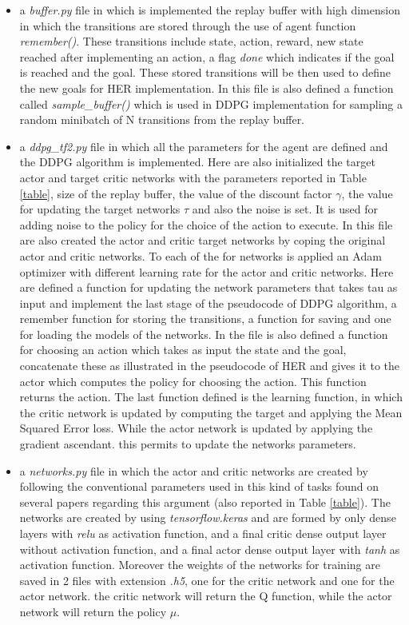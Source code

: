 \documentclass[a4paper]{report}
\begin{document}
\begin{itemize}
\item a \textit{buffer.py} file in which is implemented the replay buffer with high dimension in which the transitions are stored through the use of agent function \textit{remember()}. These transitions include state, action, reward, new state reached after implementing an action, a flag \textit{done} which indicates if the goal is reached and the goal. These stored transitions will be then used to define the new goals for HER implementation. In this file is also defined a function called \textit{sample\_buffer()} which is used in DDPG implementation for sampling a random minibatch of N transitions from the replay buffer.

\item a \textit{ddpg\_tf2.py} file in which all the parameters for the agent are defined and the DDPG algorithm is implemented. Here are also initialized the target actor and target critic networks with the parameters reported in Table \ref{table}, size of the replay buffer, the value of the discount factor $\gamma$, the value for updating the target networks $\tau$ and also the noise is set. It is used for adding noise to the policy for the choice of the action to execute. In this file are also created the actor and critic target networks by coping the original actor and critic networks. To each of the for networks is applied an Adam optimizer with different learning rate for the actor and critic networks. Here are defined a function for updating the network parameters that takes tau as input and implement the last stage of the pseudocode of DDPG algorithm, a remember function for storing the transitions, a function for saving and one for loading the models of the networks. In the file is also defined a function for choosing an action which takes as input the state and the goal, concatenate these as illustrated in the pseudocode of HER and gives it to the actor which computes the policy for choosing the action. This function returns the action. The last function defined is the learning function, in which the critic network is updated by computing the target and applying the Mean Squared Error loss. While the actor network is updated by applying the gradient ascendant. this permits to update the networks parameters.


\item a \textit{networks.py} file in which the actor and critic networks are created by following the conventional parameters used in this kind of tasks found on several papers regarding this argument (also reported in Table \ref{table}). The networks are created by using \textit{tensorflow.keras} and are formed by only dense layers with \textit{relu} as activation function, and a final critic dense output layer without activation function, and a final actor dense output layer with \textit{tanh} as activation function. Moreover the weights of the networks for training are saved in 2 files with extension \textit{.h5}, one for the critic network and one for the actor network. the critic network will return the Q function, while the actor network will return the policy $\mu$.




\end{itemize}
\end{document}
